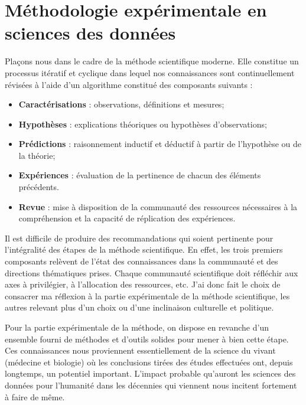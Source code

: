 \section{ \nmu Méthodologie expérimentale en sciences des données} \label{sec:xp}

Plaçons nous dans le cadre de la méthode scientifique moderne. Elle constitue un processus itératif et cyclique dans lequel nos connaissances sont continuellement révisées à l'aide d'un algorithme constitué des composants suivants :
\begin{itemize}
  \item \textbf{Caractérisations} : observations, définitions et mesures;
  \item \textbf{Hypothèses} : explications théoriques ou hypothèses d'observations;
  \item \textbf{Prédictions} : raisonnement inductif et déductif à partir de l'hypothèse ou de la théorie;
  \item \textbf{Expériences} : évaluation de la pertinence de chacun des éléments précédents.
  \item \textbf{Revue} : mise à disposition  de la communauté des ressources nécessaires à la compréhension et la capacité de réplication des expériences.
\end{itemize}

Il est difficile de produire des recommandations qui soient pertinente pour l'intégralité des étapes de la méthode scientifique. En effet, les trois premiers composants relèvent de l'état des connaissances dans la communauté et des \og directions \fg thématiques prises. Chaque communauté scientifique doit réfléchir aux axes à privilégier, à l'allocation des ressources, etc. J'ai donc fait le choix de consacrer ma réflexion à la partie expérimentale de la méthode scientifique, les autres relevant plus d'un choix ou d'une inclinaison culturelle et politique.

Pour la partie expérimentale de la méthode, on dispose en revanche d'un ensemble fourni de méthodes et d'outils solides pour mener à bien cette étape. Ces connaissances nous proviennent essentiellement de la science du vivant (médecine et biologie) où les conclusions tirées des études effectuées ont, depuis longtemps, un potentiel important. L'impact probable qu'auront les sciences des données pour l'humanité dans les décennies qui viennent nous incitent fortement à faire de même.

